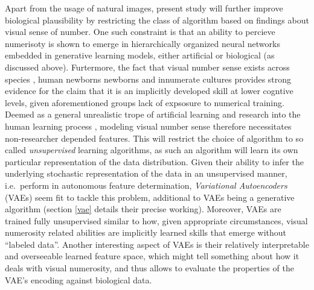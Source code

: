 \documentclass[twocolumn]{article}
\begin{document}
\indent Apart from the usage of natural images, present study will further improve biological plausibility by restricting the class of algorithm based on findings about visual sense of number. One such constraint is that an ability to percieve numerisoty is shown to emerge in hierarchically organized neural networks embedded in generative learning models, either artificial or biological (as discussed above). Furtermore, the fact that visual number sense exists across species \citep{animalsnumericalcognition}, human newborns newborns \citep[chap. 1]{lakoff} and innumerate cultures \citetext{\citealp[p.~261]{dehaene2011number}; \citealp{franka2008number}} provides strong evidence for the claim that it is an implicitly developed skill at lower cogntive levels, given aforementioned groups lack of expsosure to numerical training. Deemed as a general unrealistic trope of artificial learning \citep{dreyfus2007heideggerian} and research into the human learning process \citep{Zorzi2013}, modeling visual number sense therefore necessitates non-researcher depended features. This will restrict the choice of algorithm to so called \emph{unsupervised} learning algorithms, as such an algorithm will learn its own particular representation of the data distribution. Given their ability to infer the underlying stochastic representation of the data in an unsupervised manner, i.e.~perform in autonomous feature determination, \emph{Variational Autoencoders} (VAEs) seem fit to tackle this problem, additional to VAEs being a generative algorithm (section \ref{vae} details their precise working). Moreover, VAEs are trained fully unsupervised similar to how, given appropriate circumstances, visual numerosity related abilities are implicitly learned skills that emerge without ``labeled data''. Another interesting aspect of VAEs is their relatively interpretable and overseeable learned feature space, which might tell something about how it deals with visual numerosity, and thus allows to evaluate the properties of the VAE's encoding against biological data.
\end{document}
